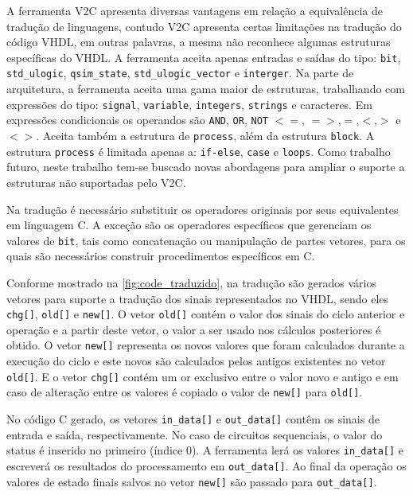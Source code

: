 \par
A ferramenta V2C apresenta diversas vantagens em relação a equivalência de tradução de linguagens, contudo V2C apresenta certas limitações na tradução do código VHDL, em outras palavras, a mesma não reconhece algumas estruturas específicas do VHDL. A ferramenta aceita apenas entradas e saídas do tipo: \texttt{bit}, \texttt{std\_ulogic}, \texttt{qsim\_state}, \texttt{std\_ulogic\_vector} e \texttt{interger}. Na parte de arquitetura, a ferramenta aceita uma gama maior de estruturas, trabalhando com expressões do tipo: \texttt{signal}, \texttt{variable}, \texttt{integers}, \texttt{strings} e caracteres. Em expressões condicionais os operandos são \texttt{AND}, \texttt{OR}, \texttt{NOT} $<=$, $=>$,$=$,$<$,$>$ e $<>$. Aceita também a estrutura de \texttt{process}, além da estrutura \texttt{block}. A estrutura \texttt{process} é limitada apenas a: \texttt{if-else}, \texttt{case} e \texttt{loops}. Como trabalho futuro, neste trabalho tem-se buscado novas abordagens para ampliar o suporte a estruturas não suportadas pelo V2C.

\par
Na tradução é necessário substituir os operadores originais por seus equivalentes em linguagem C. A exceção são os operadores específicos que gerenciam os valores de \texttt{bit}, tais como concatenação ou manipulação de partes vetores, para os quais são necessários construir procedimentos específicos em C.

Conforme mostrado na \autoref{fig:code_traduzido}, na tradução são gerados vários vetores para suporte a tradução dos sinais representados no VHDL, sendo eles \texttt{chg[]}, \texttt{old[]} e \texttt{new[]}. O vetor \texttt{old[]} contém o valor dos sinais do ciclo anterior e operação e a partir deste vetor, o valor a ser usado nos cálculos posteriores é obtido. O vetor \texttt{new[]} representa os novos valores que foram calculados durante a execução do ciclo e este novos são calculados pelos antigos existentes no vetor \texttt{old[]}. E o vetor \texttt{chg[]} contém um or exclusivo entre o valor novo e antigo e em caso de alteração entre os valores é copiado o valor de \texttt{new[]} para \texttt{old[]}.

\par
No código C gerado, os vetores \texttt{in\_data[]} e \texttt{out\_data[]} contêm os sinais de entrada e saída, respectivamente. No caso de circuitos sequenciais, o valor do status é inserido no primeiro (índice 0). A ferramenta lerá os valores \texttt{in\_data[]} e escreverá os resultados do processamento em \texttt{out\_data[]}. Ao final da operação os valores de estado finais salvos no vetor \texttt{new[]} são passado para \texttt{out\_data[]}.

